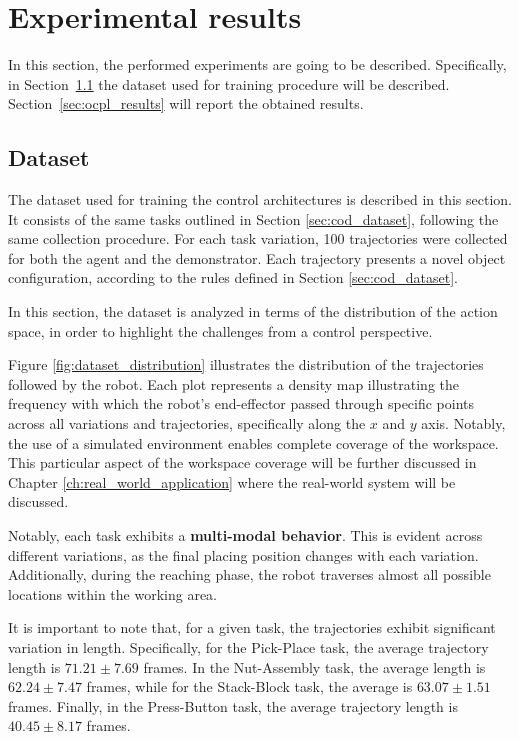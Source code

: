 \section{Experimental results}
\label{sec:ocpl_experimental}

In this section, the performed experiments are going to be described. Specifically, in  
Section~\ref{sec:ocpl_dataset} the dataset used for training procedure will be described. Section~\ref{sec:ocpl_results} will report the obtained results.

\subsection{Dataset}
\label{sec:ocpl_dataset}
The dataset used for training the control architectures is described in this section. It consists of the same tasks outlined in Section \ref{sec:cod_dataset}, following the same collection procedure. For each task variation, 100 trajectories were collected for both the agent and the demonstrator. Each trajectory presents a novel object configuration, according to the rules defined in Section \ref{sec:cod_dataset}.

In this section, the dataset is analyzed in terms of the distribution of the action space, in order to highlight the challenges from a control perspective.

Figure \ref{fig:dataset_distribution} illustrates the distribution of the trajectories followed by the robot. Each plot represents a density map illustrating the frequency with which the robot's end-effector passed through specific points across all variations and trajectories, specifically along the $x$ and $y$ axis. Notably, the use of a simulated environment enables complete coverage of the workspace. This particular aspect of the workspace coverage will be further discussed in Chapter \ref{ch:real_world_application} where the real-world system will be discussed.



Notably, each task exhibits a \textbf{multi-modal behavior}. This is evident across different variations, as the final placing position changes with each variation. Additionally, during the reaching phase, the robot traverses almost all possible locations within the working area.

It is important to note that, for a given task, the trajectories exhibit significant variation in length. Specifically, for the Pick-Place task, the average trajectory length is \textbf{$71.21 \pm 7.69$} frames. In the Nut-Assembly task, the average length is \textbf{$62.24 \pm 7.47$} frames, while for the Stack-Block task, the average is \textbf{$63.07 \pm 1.51$} frames. Finally, in the Press-Button task, the average trajectory length is\textbf{ $40.45 \pm 8.17$} frames. 

